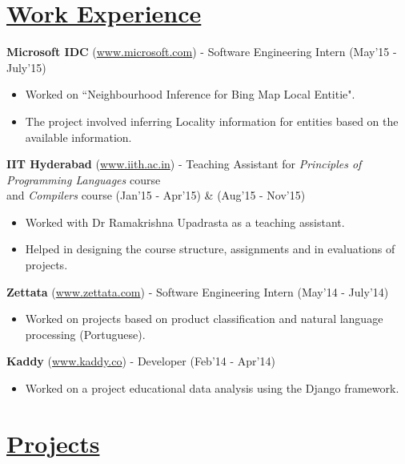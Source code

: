 \documentclass[9pt]{extarticle}
\newcommand{\heading}[1]{
\section*{\color{red}\underline{#1}}
}
\begin{document}
\heading{Work Experience}

\textbf{Microsoft IDC} (\url{www.microsoft.com}) - Software Engineering Intern \hfill (May'15 - July'15)
\begin{itemize}
\item Worked on ``Neighbourhood Inference for Bing Map Local Entitie".
\item The project involved inferring Locality information for entities based on the available information.
\end{itemize}
\space
\textbf{IIT Hyderabad} (\url{www.iith.ac.in}) - Teaching Assistant for \textit{Principles of Programming Languages} course \\ and \textit{Compilers} course \hfill (Jan'15 - Apr'15) \& (Aug'15 - Nov'15)
\begin{itemize}
\item Worked with Dr Ramakrishna Upadrasta as a teaching assistant.
\item Helped in designing the course structure, assignments and in evaluations of projects.
\end{itemize}
\space
\textbf{Zettata} (\url{www.zettata.com}) - Software Engineering Intern \hfill (May'14 - July'14)
\begin{itemize}
\item Worked on projects based on product classification and natural language processing (Portuguese).
\end{itemize}
\space
\textbf{Kaddy} (\url{www.kaddy.co}) - Developer \hfill (Feb'14 - Apr'14)
\begin{itemize}
\item Worked on a project educational data analysis using the Django framework.
\end{itemize}

\heading{Projects}
\end{document}
